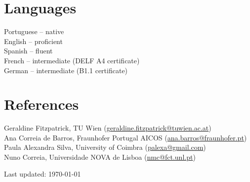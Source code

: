 \documentclass[11pt, a4paper]{article} %
\begin{document}

\section*{Languages}

Portuguese -- native\\
English -- proficient\\
Spanish -- fluent\\
French -- intermediate (DELF A4 certificate)\\
German -- intermediate (B1.1 certificate)\\

\section*{References}

Geraldine Fitzpatrick, TU Wien (\href{mailto:geraldine.fitzpatrick@tuwien.ac.at}{geraldine.fitzpatrick@tuwien.ac.at})\\
Ana Correia de Barros, Fraunhofer Portugal AICOS
(\href{mailto:ana.barros@fraunhofer.pt}{ana.barros@fraunhofer.pt})\\
Paula Alexandra Silva, University of Coimbra (\href{mailto:palexa@gmail.com}{palexa@gmail.com})\\
Nuno Correia, Universidade NOVA de Lisboa (\href{mailto:nmc@fct.unl.pt}{nmc@fct.unl.pt})\\





\begin{center}
{\scriptsize Last updated: \today\ } %
\end{center}

\end{document}
